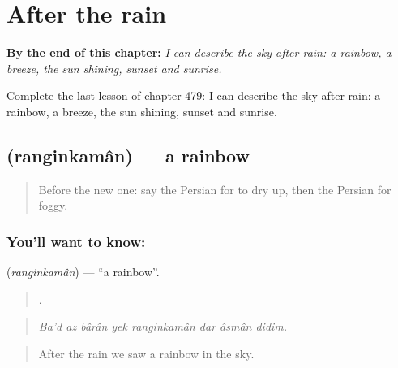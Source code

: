 
\chapter{After the rain}
\label{ch:fa-after-the-rain}

\begin{chapteropening}
\textbf{By the end of this chapter:} \emph{I can describe the sky after rain: a rainbow, a breeze, the sun shining, sunset and sunrise.}

Complete the last lesson of chapter 479: I can describe the sky after rain: a rainbow, a breeze, the sun shining, sunset and sunrise.
\end{chapteropening}

\section[\texorpdfstring{\fa{رنگین} \fa{کمان} (ranginkamân)}{رنگین کمان (ranginkamân)}]{  (ranginkamân) — a rainbow}

\label{lesson:FA-C479-ranginkaman}



\begin{quote}
Before the new one: say the Persian for to dry up, then the Persian for foggy.
\end{quote}

\subsection*{You'll want to know:  }
\textbf{ } (\emph{ranginkamân}) — \textquotedblleft{}a rainbow\textquotedblright{}.

\begin{quote}
        .
\end{quote}

\begin{quote}
\emph{Ba'd az bârân yek ranginkamân dar âsmân didim.}
\end{quote}

\begin{quote}
After the rain we saw a rainbow in the sky.
\end{quote}

